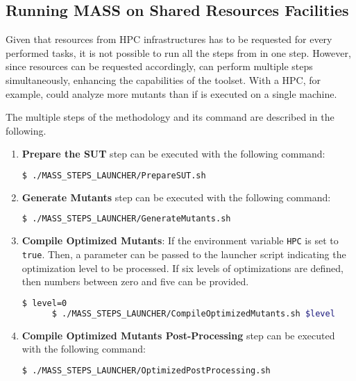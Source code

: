 \subsection{Running MASS on Shared Resources Facilities}
\label{sec:shared}

Given that resources from HPC infrastructures has to be requested for every performed tasks, it is not possible to run all the steps from \MASS in one step. 
However, since resources can be requested accordingly, \MASS can perform multiple steps simultaneously, enhancing the capabilities of the toolset. With a HPC, for example, \MASS could analyze more mutants than if \MASS is executed on a single machine.

The multiple steps of the methodology and its command are described in the following.

\begin{enumerate}
	\item \textbf{Prepare the SUT} step can be executed with the following command:

	\begin{lstlisting}[language=bash]
	  $ ./MASS_STEPS_LAUNCHER/PrepareSUT.sh
\end{lstlisting}

	\item \textbf{Generate Mutants} step can be executed with the following command:

	\begin{lstlisting}[language=bash]
	  $ ./MASS_STEPS_LAUNCHER/GenerateMutants.sh
\end{lstlisting}

	\item \textbf{Compile Optimized Mutants}: If the environment variable \texttt{HPC} is set to \texttt{true}. Then, a parameter can be passed to the launcher script indicating the optimization level to be processed. If six levels of optimizations are defined, then numbers between zero and five can be provided.

	\begin{lstlisting}[language=bash]
	  $ level=0
	  $ ./MASS_STEPS_LAUNCHER/CompileOptimizedMutants.sh $level
\end{lstlisting}

	\item \textbf{Compile Optimized Mutants Post-Processing} step can be executed with the following command:

	\begin{lstlisting}[language=bash]
	  $ ./MASS_STEPS_LAUNCHER/OptimizedPostProcessing.sh
\end{lstlisting}


\end{enumerate}
